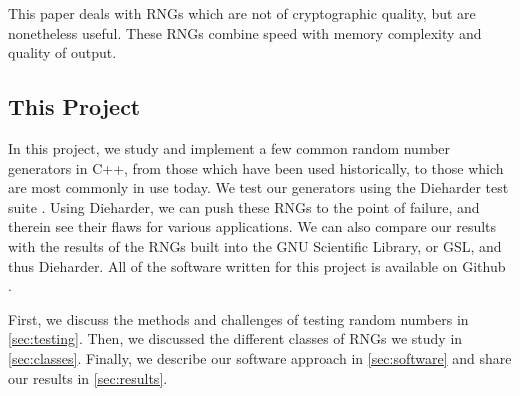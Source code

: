 This paper deals with RNGs which are not of cryptographic quality, but are nonetheless useful. These RNGs combine speed with memory complexity and quality of output.

\subsection{This Project}
In this project, we study and implement a few common random number generators in C++, from those which have been used historically, to those which are most commonly in use today. We test our generators using the Dieharder test suite \cite{dieharder}. Using Dieharder, we can push these RNGs to the point of failure, and therein see their flaws for various applications. We can also compare our results with the results of the RNGs built into the GNU Scientific Library, or GSL, and thus Dieharder. All of the software written for this project is available on Github \cite{github_repo}.

First, we discuss the methods and challenges of testing random numbers in \ref{sec:testing}. Then, we discussed the different classes of RNGs we study in \ref{sec:classes}. Finally, we describe our software approach in \ref{sec:software} and share our results in \ref{sec:results}.
